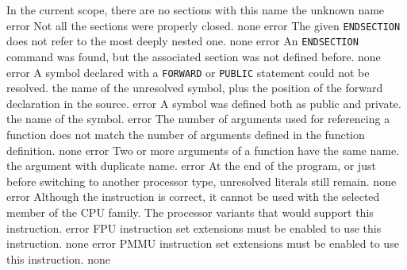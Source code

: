 \documentclass[12pt,twoside]{report}
\newcommand{\tty}[1]{{\tt #1}}
\begin{document}
\begin{description}
               {In the current scope, there are no sections with this name}
               {the unknown name}
               {error}
               {Not all the sections were properly closed.}
               {none}
               {error}
               {The given \tty{ENDSECTION} does not refer to the most
                deeply nested one.}
               {none}
               {error}
               {An \tty{ENDSECTION} command was found, but the associated section
                was not defined before.}
               {none}
               {error}
               {A symbol declared with a \tty{FORWARD} or \tty{PUBLIC} statement could
                not be resolved.}
               {the name of the unresolved symbol, plus the
                position of the forward declaration in the
                source.}
               {error}
               {A symbol was defined both as public and private.}
               {the name of the symbol.}
               {error}
               {The number of arguments used for referencing a function
                does not match the number of arguments defined in the
                function definition.}
               {none}
               {error}
               {Two or more arguments of a function have the same name.}
               {the argument with duplicate name.}
               {error}
               {At the end of the program, or just before switching to
                another processor type, unresolved literals still remain.}
               {none}
               {error}
               {Although the instruction is correct, it cannot be used with
                the selected member of the CPU family.}
               {The processor variants that would support this
                instruction.}
               {error}
               {FPU instruction set extensions must be enabled to
                use this instruction.}
               {none}
               {error}
               {PMMU instruction set extensions must be enabled
                to use this instruction.}
               {none}

\end{description}
\end{document}
